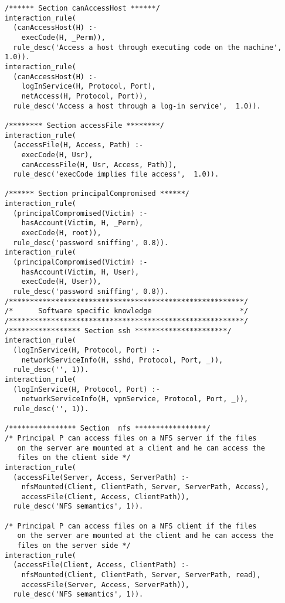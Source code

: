 \begin{lstlisting}[style=datalog, label={lst:mulval_primitives}, caption={Mulval Primitive and Derived Facts}]
/****** Section canAccessHost ******/
interaction_rule(
  (canAccessHost(H) :-
	execCode(H, _Perm)),
  rule_desc('Access a host through executing code on the machine', 1.0)).
interaction_rule(
  (canAccessHost(H) :-
	logInService(H, Protocol, Port),
	netAccess(H, Protocol, Port)),
  rule_desc('Access a host through a log-in service',  1.0)).

/******** Section accessFile ********/
interaction_rule(
  (accessFile(H, Access, Path) :-
	execCode(H, Usr),
	canAccessFile(H, Usr, Access, Path)),
  rule_desc('execCode implies file access',  1.0)).

/****** Section principalCompromised ******/
interaction_rule(
  (principalCompromised(Victim) :-
	hasAccount(Victim, H, _Perm),
	execCode(H, root)),
  rule_desc('password sniffing', 0.8)).
interaction_rule(
  (principalCompromised(Victim) :-
	hasAccount(Victim, H, User),
	execCode(H, User)),
  rule_desc('password sniffing', 0.8)).
/********************************************************/
/*      Software specific knowledge                     */
/********************************************************/
/***************** Section ssh **********************/
interaction_rule(
  (logInService(H, Protocol, Port) :-
	networkServiceInfo(H, sshd, Protocol, Port, _)),
  rule_desc('', 1)).
interaction_rule(
  (logInService(H, Protocol, Port) :-
	networkServiceInfo(H, vpnService, Protocol, Port, _)),
  rule_desc('', 1)).

/**************** Section  nfs *****************/
/* Principal P can access files on a NFS server if the files
   on the server are mounted at a client and he can access the
   files on the client side */
interaction_rule(
  (accessFile(Server, Access, ServerPath) :-
	nfsMounted(Client, ClientPath, Server, ServerPath, Access),
	accessFile(Client, Access, ClientPath)),
  rule_desc('NFS semantics', 1)).

/* Principal P can access files on a NFS client if the files
   on the server are mounted at the client and he can access the
   files on the server side */
interaction_rule(
  (accessFile(Client, Access, ClientPath) :-
	nfsMounted(Client, ClientPath, Server, ServerPath, read),
	accessFile(Server, Access, ServerPath)),
  rule_desc('NFS semantics', 1)).


\end{lstlisting}
